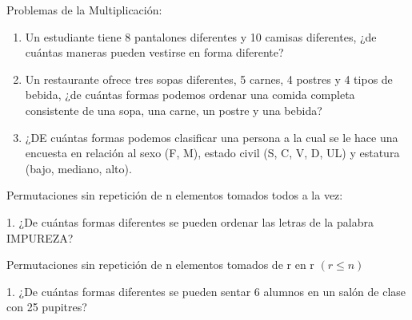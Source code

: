 \begin{frame}

Problemas de la Multiplicación:

\begin{enumerate}
\item Un estudiante tiene 8 pantalones diferentes y 10 camisas diferentes, ¿de cuántas maneras pueden vestirse en forma diferente?
\item Un restaurante ofrece tres sopas diferentes, 5 carnes, 4 postres y 4 tipos de bebida, ¿de cuántas formas podemos ordenar una comida completa consistente de una sopa, una carne, un postre y una bebida?
\item ¿DE cuántas formas podemos clasificar una persona a la cual se le hace una encuesta en relación al sexo (F, M), estado civil (S, C, V, D, UL) y estatura (bajo, mediano, alto).
\end{enumerate}
\end{frame}

\begin{frame}

Permutaciones sin repetición de n elementos tomados todos a la vez:

1. ¿De cuántas formas diferentes se pueden ordenar las letras de la palabra IMPUREZA?

Permutaciones sin repetición  de n elementos tomados de r en r $(r \leq n)$

1. ¿De cuántas formas diferentes se pueden sentar 6 alumnos en un salón de clase con 25 pupitres?



\end{frame}

\begin{frame}

\end{frame}


